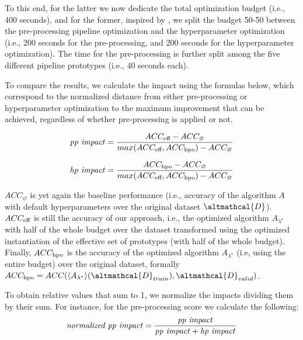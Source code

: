 To this end, for the latter we now dedicate the total optimization budget (i.e., 400 seconds), and for the former, inspired by \cite{Quemy20InfSystems}, we split the budget 50-50 between the pre-processing pipeline optimization and the hyperparameter optimization (i.e., 200 seconds for the pre-processing, and 200 seconds for the hyperparameter optimization).
The time for the pre-processing is further split among the five different pipeline prototypes (i.e., 40 seconds each).

To compare the results, we calculate the impact using the formulas below, which correspond to the normalized distance from either pre-processing or hyperparameter optimization to the maximum improvement that can be achieved, regardless of whether pre-processing is applied or not.

\begin{equation*}
    \text{\textit{pp impact}} = \frac{ACC_{\textup{eff}} - ACC_{\varnothing}}{max(ACC_{\textup{eff}}, ACC_{\textup{hpo}}) - ACC_{\varnothing}}
\end{equation*}

\begin{equation*}
    \text{\textit{hp impact}} = \frac{ACC_{\textup{hpo}} - ACC_{\varnothing}}{max(ACC_{\textup{eff}}, ACC_{\textup{hpo}}) - ACC_{\varnothing}}
\end{equation*}

$ACC_{\varnothing}$ is yet again the baseline performance (i.e., accuracy of the algorithm $A$ with default hyperparameters over the original dataset $\altmathcal{D}$).
$ACC_{\textup{eff}}$ is still the accuracy of our approach, i.e., the optimized algorithm $A_{{\lambda}^{\star}}$ with half of the whole budget over the dataset transformed using the optimized instantiation of the effective set of prototypes (with half of the whole budget).
Finally, $ACC_{\textup{hpo}}$ is the accuracy of the optimized algorithm $A_{{\lambda}^{\star}}$ (i.e, using the entire budget) over the original dataset, formally $ACC_{\textup{hpo}} = ACC( \langle A_{{\lambda}^{\star}} \rangle (\altmathcal{D}_{train}), \altmathcal{D}_{valid})$.

To obtain relative values that sum to 1, we normalize the impacts dividing them by their sum.
For instance, for the pre-processing score we calculate the following:
\begin{equation*}
    \text{\textit{normalized pp impact}} = \frac{\text{\textit{pp impact}}}
    {\text{\textit{pp impact}} + \text{\textit{hp impact}}}
\end{equation*}


